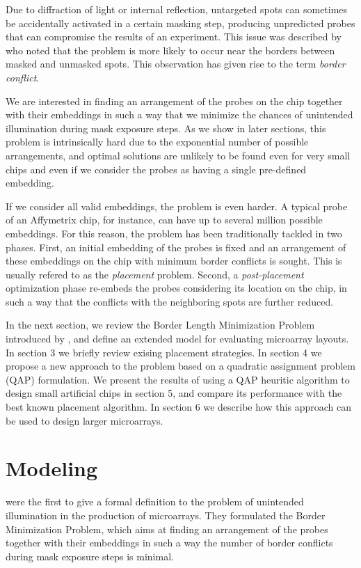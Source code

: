 \documentclass{bioinfo}
\begin{document}
Due to diffraction of light or internal reflection, untargeted spots can sometimes be accidentally activated in a certain masking step, producing unpredicted probes that can compromise the results of an experiment. This issue was described by \citealp{FODOR91} who noted that the problem is more likely to occur near the borders between masked and unmasked spots. This observation has given rise to the term \emph{border conflict}.

We are interested in finding an arrangement of the probes on the chip together with their embeddings in such a way that we minimize the chances of unintended illumination during mask exposure steps. As we show in later sections, this problem is intrinsically hard due to the exponential number of possible arrangements, and optimal solutions are unlikely to be found even for very small chips and even if we consider the probes as having a single pre-defined embedding.

If we consider all valid embeddings, the problem is even harder. A typical probe of an Affymetrix chip, for instance, can have up to several million possible embeddings. For this reason, the problem has been traditionally tackled in two phases. First, an initial embedding of the probes is fixed and an arrangement of these embeddings on the chip with minimum border conflicts is sought. This is usually refered to as the \emph{placement} problem. Second, a \emph{post-placement} optimization phase re-embeds the probes considering its location on the chip, in such a way that the conflicts with the neighboring spots are further reduced.

In the next section, we review the Border Length Minimization Problem introduced by \citealp{HANNENHALLI02}, and define an extended model for evaluating microarray layouts. In section 3 we briefly review exising placement strategies. In section 4 we propose a new approach to the problem based on a quadratic assignment problem (QAP) formulation. We present the results of using a QAP heuritic algorithm to design small artificial chips in section 5, and compare its performance with the best known placement algorithm. In section 6 we describe how this approach can be used to design larger microarrays.

\section{Modeling}

\citealp{HANNENHALLI02} were the first to give a formal definition to the problem of unintended illumination in the production of microarrays. They formulated the Border Minimization Problem, which aims at finding an arrangement of the probes together with their embeddings in such a way the number of border conflicts during mask exposure steps is minimal.
\end{document}
